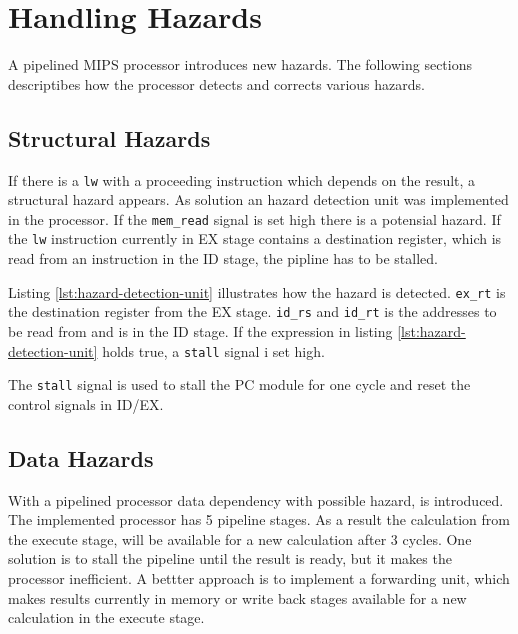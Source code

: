 \section{Handling Hazards}
A pipelined MIPS processor introduces new hazards.
The following sections descriptibes how the processor detects and corrects various hazards.

\subsection{Structural Hazards}
If there is a \texttt{lw} with a proceeding instruction which depends on the result,
a structural hazard appears.
As solution an hazard detection unit was implemented in the processor.
If the \texttt{mem\_read} signal is set high there is a potensial hazard.
If the \texttt{lw} instruction currently in EX stage contains a destination register,
which is read from an instruction in the ID stage, the pipline has to be stalled.

Listing \ref{lst:hazard-detection-unit} illustrates how the hazard is detected.
\texttt{ex\_rt} is the destination register from the EX stage.
\texttt{id\_rs} and \texttt{id\_rt} is the addresses to be read from and is in the ID stage.
If the expression in listing \ref{lst:hazard-detection-unit} holds true, a \texttt{stall} signal i set high.

The \texttt{stall} signal is used to stall the PC module for one cycle and reset the control signals in ID/EX.


\subsection{Data Hazards}
With a pipelined processor data dependency with possible hazard, is introduced.
The implemented processor has 5 pipeline stages.
As a result the calculation from the execute stage, will be available for a new calculation after 3 cycles.
One solution is to stall the pipeline until the result is ready, but it makes the processor inefficient.
A bettter approach is to implement a forwarding unit,
which makes results currently in memory or write back stages available for a new calculation in the execute stage.

